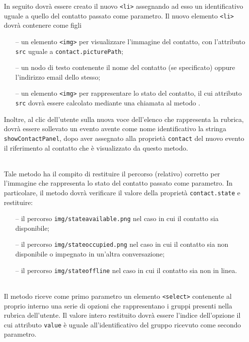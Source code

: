 \begin{description}
In seguito dovrà essere creato il nuovo \verb'<li>' assegnando ad esso un identificativo uguale a quello del contatto passato come parametro. Il nuovo elemento \verb'<li>' dovrà contenere come figli
\begin{itemize}
  \item[--] un elemento \verb'<img>' per visualizzare l'immagine del contatto, con l'attributo \verb'src' uguale a \verb'contact.picturePath';
  \item[--] un nodo di testo contenente il nome del contatto (se specificato) oppure l'indirizzo email dello stesso;
  \item[--] un elemento \verb'<img>' per rappresentare lo stato del contatto, il cui attributo \verb'src' dovrà essere calcolato mediante una chiamata al metodo .
\end{itemize}

Inoltre, al clic dell'utente sulla nuova voce dell'elenco che rappresenta la rubrica, dovrà essere sollevato un evento avente come nome identificativo la stringa \verb'showContactPanel', dopo aver assegnato alla proprietà \verb'contact' del nuovo evento il riferimento al contatto che è visualizzato da questo metodo.

\item{}\\
Tale metodo ha il compito di restituire il percorso (relativo) corretto per l'immagine che rappresenta lo stato del contatto passato come parametro. In particolare, il metodo dovrà verificare il valore della proprietà \verb'contact.state' e restituire:
\begin{itemize}
  \item[--] il percorso \verb'img/stateavailable.png' nel caso in cui il contatto sia disponibile;
  \item[--] il percorso \verb'img/stateoccupied.png' nel caso in cui il contatto sia non disponibile o impegnato in un'altra conversazione;
  \item[--] il percorso \verb'img/stateoffline' nel caso in cui il contatto sia non in linea.
\end{itemize}

\item{}\\
Il metodo riceve come primo parametro un elemento \verb'<select>' contenente al proprio interno una serie di opzioni che rappresentano i gruppi presenti nella rubrica dell'utente. Il valore intero restituito dovrà essere l'indice dell'opzione il cui attributo \verb'value' è uguale all'identificativo del gruppo ricevuto come secondo parametro.


\end{description}
